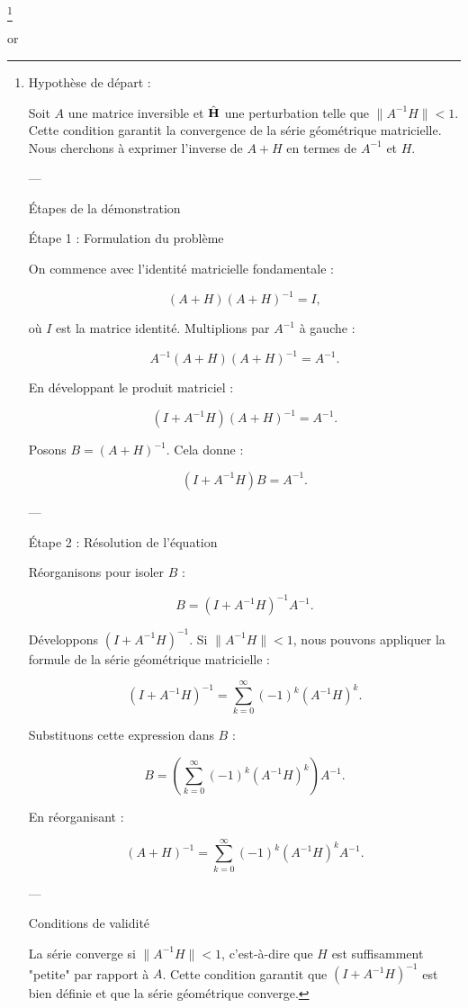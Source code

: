 \footnote{
Hypothèse de départ : 

Soit $A$ une matrice inversible et $\hat{\mathbf{H}}$ une perturbation telle que \( \| A^{-1} H \| < 1 \).  
Cette condition garantit la convergence de la série géométrique matricielle. Nous cherchons à exprimer l’inverse de \( A + H \) en termes de \( A^{-1} \) et \( H \).

---

Étapes de la démonstration

Étape 1 : Formulation du problème

On commence avec l'identité matricielle fondamentale :

\[
(A + H)(A + H)^{-1} = I,
\]

où \( I \) est la matrice identité. Multiplions par \( A^{-1} \) à gauche :

\[
A^{-1}(A + H)(A + H)^{-1} = A^{-1}.
\]

En développant le produit matriciel :

\[
(I + A^{-1} H)(A + H)^{-1} = A^{-1}.
\]

Posons \( B = (A + H)^{-1} \). Cela donne :

\[
(I + A^{-1} H)B = A^{-1}.
\]

---

Étape 2 : Résolution de l’équation

Réorganisons pour isoler \( B \) :

\[
B = (I + A^{-1} H)^{-1} A^{-1}.
\]

Développons \( (I + A^{-1} H)^{-1} \). Si \( \| A^{-1} H \| < 1 \), nous pouvons appliquer la formule de la série géométrique matricielle :

\[
(I + A^{-1} H)^{-1} = \sum_{k=0}^\infty (-1)^k (A^{-1} H)^k.
\]

Substituons cette expression dans \( B \) :

\[
B = \left( \sum_{k=0}^\infty (-1)^k (A^{-1} H)^k \right) A^{-1}.
\]

En réorganisant :

\[
(A + H)^{-1} = \sum_{k=0}^\infty (-1)^k (A^{-1} H)^k A^{-1}.
\]

---

Conditions de validité

La série converge si \( \| A^{-1} H \| < 1 \), c’est-à-dire que \( H \) est suffisamment "petite" par rapport à \( A \).  
Cette condition garantit que \( (I + A^{-1} H)^{-1} \) est bien définie et que la série géométrique converge.
}

or 

